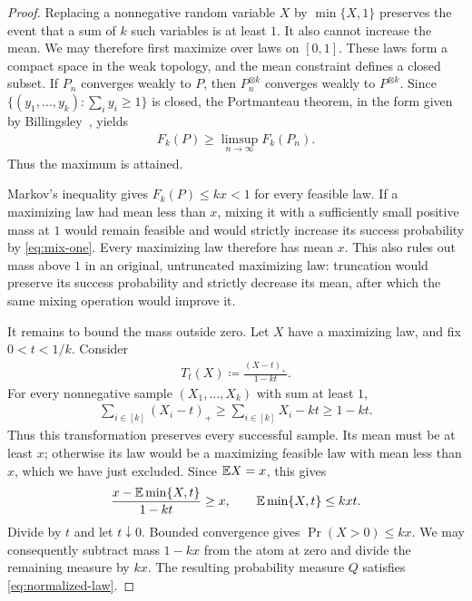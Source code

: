 \begin{proof}
Replacing a nonnegative random variable $X$ by $\min\{X,1\}$ preserves the event that a sum of $k$ such variables is at least $1$. It also cannot increase the mean. We may therefore first maximize over laws on $[0,1]$. These laws form a compact space in the weak topology, and the mean constraint defines a closed subset. If $P_n$ converges weakly to $P$, then $P_n^{\otimes k}$ converges weakly to $P^{\otimes k}$. Since $\{(y_1,\ldots,y_k)\colon\sum_i y_i\ge1\}$ is closed, the Portmanteau theorem, in the form given by Billingsley~\cite{Billingsley1999}, yields
\begin{align*}
 F_k(P)\ge\limsup_{n\to\infty}F_k(P_n).
\end{align*}
Thus the maximum is attained.

Markov's inequality gives $F_k(P)\le kx<1$ for every feasible law. If a maximizing law had mean less than $x$, mixing it with a sufficiently small positive mass at $1$ would remain feasible and would strictly increase its success probability by \cref{eq:mix-one}. Every maximizing law therefore has mean $x$. This also rules out mass above $1$ in an original, untruncated maximizing law: truncation would preserve its success probability and strictly decrease its mean, after which the same mixing operation would improve it.

It remains to bound the mass outside zero. Let $X$ have a maximizing law, and fix $0<t<1/k$. Consider
\begin{align*}
 T_t(X)\coloneqq\frac{(X-t)_+}{1-kt}.
\end{align*}
For every nonnegative sample $(X_1,\ldots,X_k)$ with sum at least $1$,
\begin{align*}
 \sum_{i\in[k]}(X_i-t)_+\ge\sum_{i\in[k]}X_i-kt\ge1-kt.
\end{align*}
Thus this transformation preserves every successful sample. Its mean must be at least $x$; otherwise its law would be a maximizing feasible law with mean less than $x$, which we have just excluded. Since $\mathbb E X=x$, this gives
\begin{align*}
 \frac{x-\mathbb E\min\{X,t\}}{1-kt}\ge x,
 \qquad \mathbb E\min\{X,t\}\le kxt.
\end{align*}
Divide by $t$ and let $t\downarrow0$. Bounded convergence gives $\Pr(X>0)\le kx$. We may consequently subtract mass $1-kx$ from the atom at zero and divide the remaining measure by $kx$. The resulting probability measure $Q$ satisfies \cref{eq:normalized-law}.
\end{proof}

